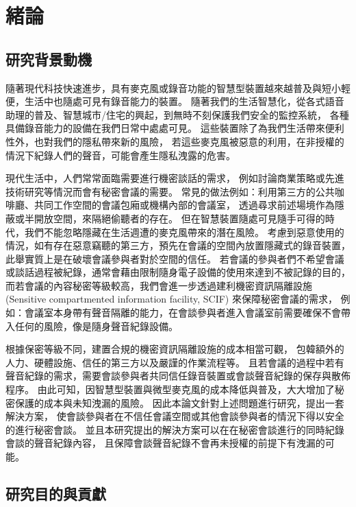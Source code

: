\chapter{緒論}\label{chapter:intro}

\section{研究背景動機}\label{section:intro-background}

    隨著現代科技快速進步，具有麥克風或錄音功能的智慧型裝置越來越普及與短小輕便，生活中也隨處可見有錄音能力的裝置。
隨著我們的生活智慧化，從各式語音助理的普及、智慧城市/住宅的興起，到無時不刻保護我們安全的監控系統，
各種具備錄音能力的設備在我們日常中處處可見。
這些裝置除了為我們生活帶來便利性外，也對我們的隱私帶來新的風險，
若這些麥克風被惡意的利用，在非授權的情況下紀錄人們的聲音，可能會產生隱私洩露的危害。

    現代生活中，人們常常面臨需要進行機密談話的需求，
例如討論商業策略或先進技術研究等情況而會有秘密會議的需要。
常見的做法例如：利用第三方的公共咖啡廳、共同工作空間的會議包廂或機構內部的會議室，
透過尋求前述場境作為隱蔽或半開放空間，來隔絕偷聽者的存在。
但在智慧裝置隨處可見隨手可得的時代，我們不能忽略隱藏在生活週遭的麥克風帶來的潛在風險。
考慮到惡意使用的情況，如有存在惡意竊聽的第三方，預先在會議的空間內放置隱藏式的錄音裝置，
此舉實質上是在破壞會議參與者對於空間的信任。
若會議的參與者們不希望會議或談話過程被紀錄，通常會藉由限制隨身電子設備的使用來達到不被記錄的目的，
而若會議的內容秘密等級較高，我們會進一步透過建利機密資訊隔離設施
(Sensitive compartmented information facility, SCIF) 來保障秘密會議的需求，
例如：會議室本身帶有聲音隔離的能力，在會談參與者進入會議室前需要確保不會帶入任何的風險，像是隨身聲音紀錄設備。

    根據保密等級不同，建置合規的機密資訊隔離設施的成本相當可觀，
包韓額外的人力、硬體設施、信任的第三方以及嚴謹的作業流程等。
且若會議的過程中若有聲音紀錄的需求，需要會談參與者共同信任錄音裝置或會談聲音紀錄的保存與散佈程序。
由此可知，因智慧型裝置與微型麥克風的成本降低與普及，大大增加了秘密保護的成本與未知洩漏的風險。
因此本論文針對上述問題進行研究，提出一套解決方案，
使會談參與者在不信任會議空間或其他會談參與者的情況下得以安全的進行秘密會談。
並且本研究提出的解決方案可以在在秘密會談進行的同時紀錄會談的聲音紀錄內容，
且保障會談聲音紀錄不會再未授權的前提下有洩漏的可能。


\section{研究目的與貢獻}\label{section:intro-purpose}

